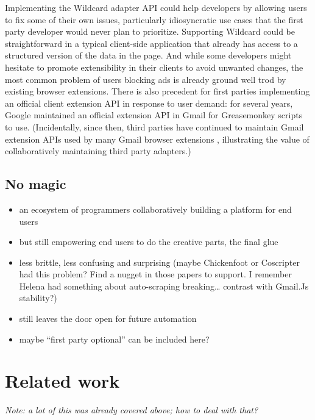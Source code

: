 \documentclass[english,submission]{programming}
\providecommand{\tightlist}{%
  \setlength{\itemsep}{0pt}\setlength{\parskip}{0pt}}
\begin{document}
Implementing the Wildcard adapter API could help developers by allowing
users to fix some of their own issues, particularly idiosyncratic use
cases that the first party developer would never plan to prioritize.
Supporting Wildcard could be straightforward in a typical client-side
application that already has access to a structured version of the data
in the page. And while some developers might hesitate to promote
extensibility in their clients to avoid unwanted changes, the most
common problem of users blocking ads is already ground well trod by
existing browser extensions. There is also precedent for first parties
implementing an official client extension API in response to user
demand: for several years, Google maintained an official extension API
in Gmail for Greasemonkey scripts to use. (Incidentally, since then,
third parties have continued to maintain Gmail extension APIs used by
many Gmail browser extensions \autocite{streak,talwar2019}, illustrating
the value of collaboratively maintaining third party adapters.)

\hypertarget{no-magic}{%
\subsection{No magic}\label{no-magic}}

\begin{itemize}
\tightlist
\item
  an ecosystem of programmers collaboratively building a platform for
  end users
\item
  but still empowering end users to do the creative parts, the final
  glue
\item
  less brittle, less confusing and surprising (maybe Chickenfoot or
  Coscripter had this problem? Find a nugget in those papers to support.
  I remember Helena had something about auto-scraping breaking\ldots{}
  contrast with Gmail.Js stability?)
\item
  still leaves the door open for future automation
\item
  maybe ``first party optional'' can be included here?
\end{itemize}

\hypertarget{related-work}{%
\section{Related work}\label{related-work}}

\emph{Note: a lot of this was already covered above; how to deal with
that?}
\end{document}
